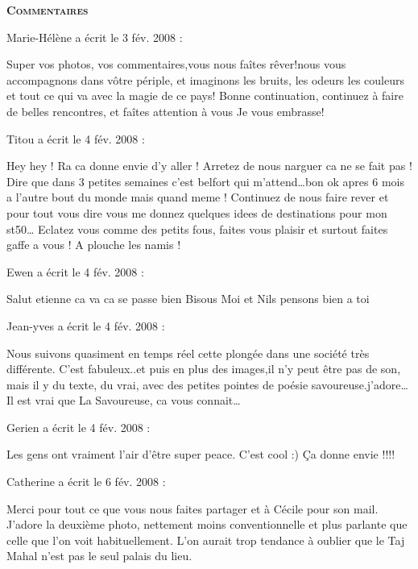 \bigskip
\textbf{\textsc{Commentaires}}

\medskip
Marie-Hélène a écrit le 3 fév. 2008 :
\begin{displayquote}
Super vos photos, vos commentaires,vous nous faîtes rêver!nous vous accompagnons dans vôtre périple, et imaginons les bruits, les odeurs les couleurs et tout ce qui va avec la magie de ce pays!
Bonne continuation, continuez à faire de belles rencontres, et faîtes attention à vous
Je vous embrasse!
\end{displayquote}

\medskip
Titou a écrit le 4 fév. 2008 :
\begin{displayquote}
Hey hey ! Ra ca donne envie d'y aller ! Arretez de nous narguer ca ne se fait pas ! Dire que dans 3 petites semaines c'est belfort qui m'attend\dots bon ok apres 6 mois a l'autre bout du monde mais quand meme ! Continuez de nous faire rever et pour tout vous dire vous me donnez quelques idees de destinations pour mon st50\dots
Eclatez vous comme des petits fous, faites vous plaisir et surtout faites gaffe a vous ! A plouche les namis !
\end{displayquote}

\medskip
Ewen a écrit le 4 fév. 2008 :
\begin{displayquote}
Salut etienne ca va ca se passe	bien
Bisous  Moi et Nils pensons bien a toi
\end{displayquote}

\medskip
Jean-yves a écrit le 4 fév. 2008 :
\begin{displayquote}
Nous suivons quasiment en temps réel cette plongée dans une société très différente. C'est fabuleux..et puis en plus des images,il n'y peut être pas de son, mais il y du texte, du vrai, avec des petites pointes de poésie  savoureuse.j'adore\dots
Il est vrai que La Savoureuse, ca vous connait\dots
\end{displayquote}

\medskip
Gerien a écrit le 4 fév. 2008 :
\begin{displayquote}
Les gens ont vraiment l'air d'être super peace. C'est cool :)
Ça donne envie !!!!
\end{displayquote}

\medskip
Catherine a écrit le 6 fév. 2008 :
\begin{displayquote}
Merci pour tout ce que vous nous faites partager et à Cécile pour son mail.
        J'adore la deuxième photo, nettement moins conventionnelle et plus parlante que celle que l'on voit habituellement. L'on aurait trop tendance à oublier que le Taj Mahal n'est pas le seul palais du lieu.
\end{displayquote}

